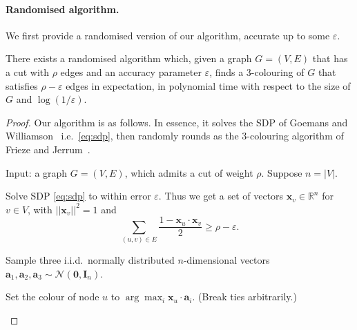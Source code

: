 \documentclass[a4paper,11pt, DIV=11]{scrartcl}
\newcommand{\vx}{\ensuremath{\mathbf{x}}}
\newcommand{\va}{\ensuremath{\mathbf{a}}}
\renewcommand{\epsilon}{\varepsilon}
\renewcommand{\R}{\ensuremath{\mathbb{R}}}
\theoremstyle{plain}
\theoremstyle{definition}
\begin{document}
\paragraph{Randomised algorithm.} We first provide a randomised version of our algorithm, accurate up to some $\epsilon$.

\begin{theorem}
    There exists a randomised algorithm which, given a graph $G = (V, E)$ that has a cut with $\rho$ edges and an accuracy parameter $\epsilon$, finds a 3-colouring of $G$ that satisfies $\rho-\epsilon$ edges in expectation, in polynomial time with respect to the size of $G$ and $\log(1 / \epsilon)$.
\end{theorem}

\begin{proof}
Our algorithm is as follows. In essence, it solves the SDP of Goemans and Williamson~\cite{GW95} i.e.~\eqref{eq:sdp}, then randomly rounds as the 3-colouring algorithm of Frieze and Jerrum~\cite{FJ97}.

\begin{algoEnum}
    \item Input: a graph $G = (V, E)$, which admits a cut of weight $\rho$. Suppose $n = |V|$.
    \item Solve SDP \eqref{eq:sdp} to within error $\epsilon$. Thus we get a set of vectors $\vx_v \in \R^n$ for $v \in V$, with $||\vx_v||^2 = 1$ and 
    \[
    \sum_{(u, v) \in E} \frac{1 - \vx_u \cdot \vx_v}{2} \geq \rho - \epsilon.
    \]
    \item Sample three i.i.d.~normally distributed $n$-dimensional vectors $\va_1, \va_2, \va_3 \sim \mathcal{N}(\mathbf{0}, \mathbf{I}_n)$.
    \item Set the colour of node $u$ to $\arg \max_i \vx_u \cdot \va_i$. (Break ties arbitrarily.)
\end{algoEnum}


\end{proof}
\end{document}
